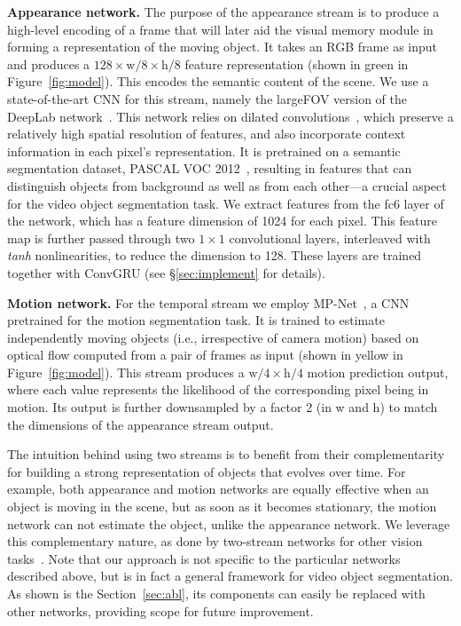 \documentclass[10pt,twocolumn,letterpaper]{article}
\begin{document}
\noindent \textbf{Appearance network.}
The purpose of the appearance stream is to produce a high-level encoding of a
frame that will later aid the visual memory module in forming a representation
of the moving object. It takes an RGB frame as input and produces a $128 \times
\text{w}/8 \times \text{h}/8$ feature representation (shown in green in
Figure~\ref{fig:model}). This encodes the semantic content of the scene. We use
a state-of-the-art CNN for this stream, namely the largeFOV version of the
DeepLab network~\cite{chen2014semantic}. This network relies on dilated
convolutions~\cite{chen2014semantic}, which preserve a relatively high spatial
resolution of features, and also incorporate context information in each
pixel's representation. It is pretrained on a semantic segmentation dataset,
PASCAL VOC 2012~\cite{pascalvoc2012}, resulting in features that can
distinguish objects from background as well as from each other---a crucial
aspect for the video object segmentation task. We extract features from the fc6
layer of the network, which has a feature dimension of 1024 for each pixel.
This feature map is further passed through two $1 \times 1$ convolutional
layers, interleaved with \textit{tanh} nonlinearities, to reduce the dimension
to 128. These layers are trained together with ConvGRU (see
\S\ref{sec:implement} for details).

\noindent \textbf{Motion network.}
For the temporal stream we employ MP-Net~\cite{tokmakov2016learning}, a CNN
pretrained for the motion segmentation task. It is trained to estimate
independently moving objects (i.e., irrespective of camera motion) based on
optical flow computed from a pair of frames as input (shown in yellow in
Figure~\ref{fig:model}). This stream produces a $\text{w}/4 \times \text{h}/4$
motion prediction output, where each value represents the likelihood of the
corresponding pixel being in motion. Its output is further downsampled by a
factor 2 (in w and h) to match the dimensions of the appearance stream output.

The intuition behind using two streams is to benefit from their complementarity
for building a strong representation of objects that evolves over time. For
example, both appearance and motion networks are equally effective when an
object is moving in the scene, but as soon as it becomes stationary, the motion
network can not estimate the object, unlike the appearance network. We leverage
this complementary nature, as done by two-stream networks for other vision
tasks~\cite{simonyan2014two}. Note that our approach is not specific to the
particular networks described above, but is in fact a general framework for
video object segmentation. As shown is the Section~\ref{sec:abl}, its
components can easily be replaced with other networks, providing scope for
future improvement.
\end{document}

